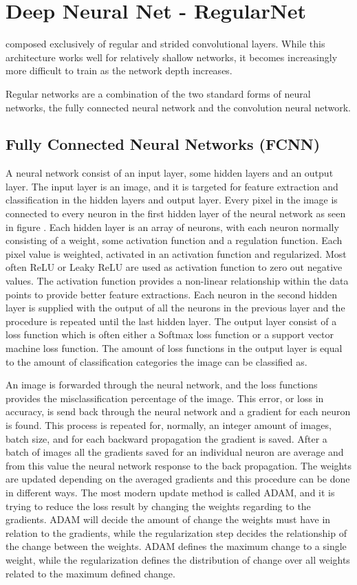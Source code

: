 \section{Deep Neural Net - RegularNet}
composed exclusively of regular and strided convolutional layers. While this architecture works well for relatively shallow networks, it becomes increasingly more difficult to train as the network depth increases.

Regular networks are a combination of the two standard forms of neural networks, the fully connected neural network and the convolution neural network.

\subsection{Fully Connected Neural Networks (FCNN)}
A neural network consist of an input layer, some hidden layers and an output layer. The input layer is an image, and it is targeted for feature extraction and classification in the hidden layers and output layer. Every pixel in the image is connected to every neuron in the first hidden layer of the neural network as seen in figure .    
Each hidden layer is an array of neurons, with each neuron normally consisting of a weight, some activation function and a regulation function. Each pixel value is weighted, activated in an activation function and regularized. Most often ReLU or Leaky ReLU are used as activation function to zero out negative values. The activation function provides a non-linear relationship within the data points to provide better feature extractions. Each neuron in the second hidden layer is supplied with the output of all the neurons in the previous layer and the procedure is repeated until the last hidden layer. The output layer consist of a loss function which is often either a Softmax loss function or a support vector machine loss function. The amount of loss functions in the output layer is equal to the amount of classification categories the image can be classified as.

An image is forwarded through the neural network, and the loss functions provides the misclassification percentage of the image. This error, or loss in accuracy, is send back through the neural network and a gradient for each neuron is found. This process is repeated for, normally, an integer amount of images, batch size, and for each backward propagation the gradient is saved. After a batch of images all the gradients saved for an individual neuron are average and from this value the neural network response to the back propagation. The weights are updated depending on the averaged gradients and this procedure can be done in different ways. The most modern update method is called ADAM, and it is trying to reduce the loss result by changing the weights regarding to the gradients. ADAM will decide the amount of change the weights must have in relation to the gradients, while the regularization step decides the relationship of the change between the weights. ADAM defines the maximum change to a single weight, while the regularization defines the distribution of change over all weights related to the maximum defined change.

